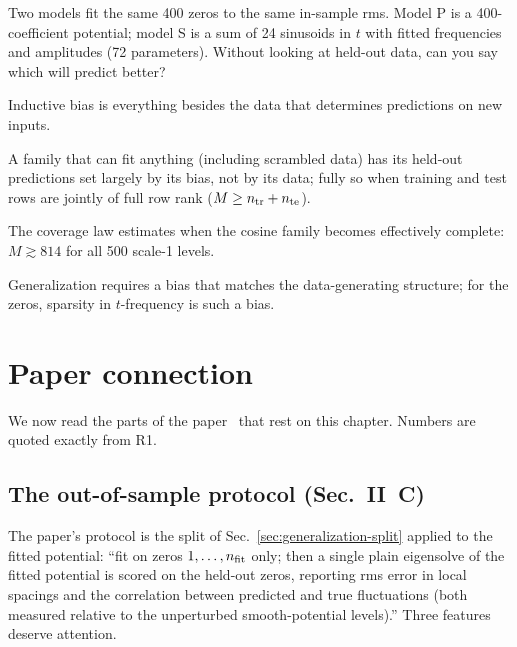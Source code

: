 \begin{checkpoint}
Two models fit the same 400 zeros to the same in-sample rms. Model P is a 400-coefficient potential; model S is a sum of 24 sinusoids in $t$ with fitted frequencies and amplitudes (72 parameters). Without looking at held-out data, can you say which will predict better?
\end{checkpoint}

\begin{keyideas}
\item Inductive bias is everything besides the data that determines predictions on new inputs.
\item A family that can fit anything (including scrambled data) has its held-out predictions set largely by its bias, not by its data; fully so when training and test rows are jointly of full row rank ($M\ge n_{\rm tr}+n_{\rm te}$).
\item The coverage law estimates when the cosine family becomes effectively complete: $M\gtrsim814$ for all 500 scale-1 levels.
\item Generalization requires a bias that matches the data-generating structure; for the zeros, sparsity in $t$-frequency is such a bias.
\end{keyideas}

\section{Paper connection}\label{sec:generalization-paper}

We now read the parts of the paper~\cite{soniR1} that rest on this chapter. Numbers are quoted exactly from R1.

\subsection{The out-of-sample protocol (Sec.~II~C)}

The paper's protocol is the split of Sec.~\ref{sec:generalization-split} applied to the fitted potential: ``fit on zeros $1,\dots,n_{\rm fit}$ only; then a single plain eigensolve of the fitted potential is scored on the held-out zeros, reporting rms error in local spacings and the correlation between predicted and true fluctuations (both measured relative to the unperturbed smooth-potential levels).'' Three features deserve attention.

